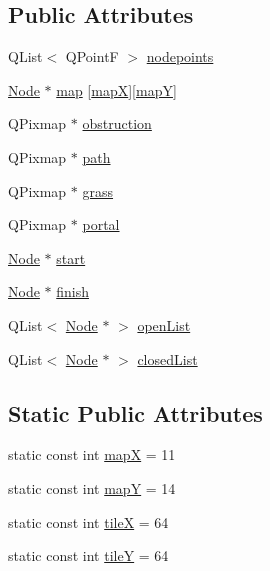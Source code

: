 \subsection*{Public Attributes}
\begin{DoxyCompactItemize}
\item 
Q\+List$<$ Q\+PointF $>$ \hyperlink{class_map_a07f51de84c133707fedaeffd04aff2d5}{nodepoints}
\item 
\hyperlink{class_node}{Node} $\ast$ \hyperlink{class_map_a7298e7a7b5dbdc642c49ded9a2c754a5}{map} \mbox{[}\hyperlink{class_map_acfd20721da29a2e353598555e23e12f0}{mapX}\mbox{]}\mbox{[}\hyperlink{class_map_ae08efae9ac1453b2690985c627aca358}{mapY}\mbox{]}
\item 
Q\+Pixmap $\ast$ \hyperlink{class_map_af0167137084000cfb58a33df8474bcbe}{obstruction}
\item 
Q\+Pixmap $\ast$ \hyperlink{class_map_a99d78bd384bf091660dbc6e1123419b0}{path}
\item 
Q\+Pixmap $\ast$ \hyperlink{class_map_a322ef8e3f55269ef565a58f20190d148}{grass}
\item 
Q\+Pixmap $\ast$ \hyperlink{class_map_a4dafaf125d6014a97e98168e41492cd5}{portal}
\item 
\hyperlink{class_node}{Node} $\ast$ \hyperlink{class_map_aafcbf6f458eb48f4945f3d0b58d2ef85}{start}
\item 
\hyperlink{class_node}{Node} $\ast$ \hyperlink{class_map_abdb357cb53c27be3b6e3c2b54bfde669}{finish}
\item 
Q\+List$<$ \hyperlink{class_node}{Node} $\ast$ $>$ \hyperlink{class_map_ab19ca30427e7257d713f5fcfa0ac1a10}{open\+List}
\item 
Q\+List$<$ \hyperlink{class_node}{Node} $\ast$ $>$ \hyperlink{class_map_ae1ced58b787598940bb444659bacd7d3}{closed\+List}
\end{DoxyCompactItemize}
\subsection*{Static Public Attributes}
\begin{DoxyCompactItemize}
\item 
static const int \hyperlink{class_map_acfd20721da29a2e353598555e23e12f0}{mapX} = 11
\item 
static const int \hyperlink{class_map_ae08efae9ac1453b2690985c627aca358}{mapY} = 14
\item 
static const int \hyperlink{class_map_af2aa425dd22aba483ae973c4a15fe934}{tileX} = 64
\item 
static const int \hyperlink{class_map_a483dfba507cee9d2fa60a074992b1fcf}{tileY} = 64
\end{DoxyCompactItemize}


